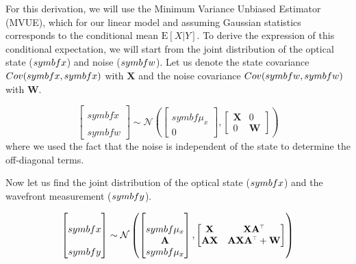 \documentclass[SE,authoryear,toc]{lsstdoc}
\renewcommand{\v}[1]{\mathbf{#1}}
\newcommand{\tr}{\scalebox{0.6}{$\top$}}
\begin{document}
For this derivation, we will use the Minimum Variance Unbiased Estimator (MVUE), which for our linear model and assuming Gaussian statistics corresponds to the conditional mean $\mathrm{E}[X | Y]$. To derive the expression of this conditional expectation, we will start from the joint distribution of the optical state ($\\symbf{x}$) and noise ($\\symbf{w}$). Let us denote the state covariance $Cov(\\symbf{x}, \\symbf{x})$ with  $\v{X}$ and the noise covariance $Cov(\\symbf{w}, \\symbf{w})$ with $\v{W}$.  

\begin{equation}
    \begin{bmatrix}
        \\symbf{x} \\
        \\symbf{w}
    \end{bmatrix}
    \sim \mathcal{N} \left(
    \begin{bmatrix}
        \\symbf{\mu_x} \\
        0
    \end{bmatrix},
    \begin{bmatrix}
        \v{X} & 0 \\
        0 & \v{W}
    \end{bmatrix}
    \right) 
\end{equation}
where we used the fact that the noise is independent of the state to determine the off-diagonal terms.

Now let us find the joint distribution of the optical state ($\\symbf{x}$) and the wavefront measurement ($\\symbf{y}$). 

\begin{equation}
    \begin{bmatrix}
        \\symbf{x} \\
        \\symbf{y}
    \end{bmatrix}
    \sim \mathcal{N} \left(
    \begin{bmatrix}
        \\symbf{\mu_x} \\
        \v{A}\\symbf{\mu_x}
    \end{bmatrix},
    \begin{bmatrix}
        \v{X} & \v{X}\v{A}^{\tr} \\
        \v{A}\v{X} & \v{A}\v{X}\v{A}^{\tr} + \v{W}
    \end{bmatrix}
    \right) 
\end{equation}
\end{document}
